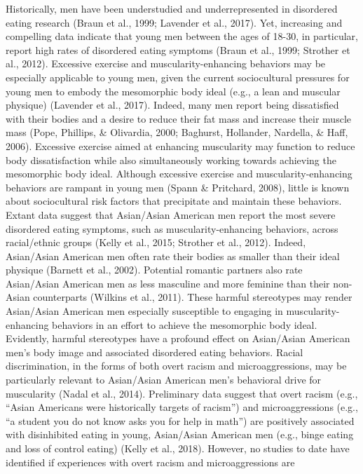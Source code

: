 \documentclass[
  12pt,
]{article}
\begin{document}
Historically, men have been understudied and underrepresented in
disordered eating research (Braun et al., 1999; Lavender et al., 2017).
Yet, increasing and compelling data indicate that young men between the
ages of 18-30, in particular, report high rates of disordered eating
symptoms (Braun et al., 1999; Strother et al., 2012). Excessive exercise
and muscularity-enhancing behaviors may be especially applicable to
young men, given the current sociocultural pressures for young men to
embody the mesomorphic body ideal (e.g., a lean and muscular physique)
(Lavender et al., 2017). Indeed, many men report being dissatisfied with
their bodies and a desire to reduce their fat mass and increase their
muscle mass (Pope, Phillips, \& Olivardia, 2000; Baghurst, Hollander,
Nardella, \& Haff, 2006). Excessive exercise aimed at enhancing
muscularity may function to reduce body dissatisfaction while also
simultaneously working towards achieving the mesomorphic body ideal.
Although excessive exercise and muscularity-enhancing behaviors are
rampant in young men (Spann \& Pritchard, 2008), little is known about
sociocultural risk factors that precipitate and maintain these
behaviors. Extant data suggest that Asian/Asian American men report the
most severe disordered eating symptoms, such as muscularity-enhancing
behaviors, across racial/ethnic groups (Kelly et al., 2015; Strother et
al., 2012). Indeed, Asian/Asian American men often rate their bodies as
smaller than their ideal physique (Barnett et al., 2002). Potential
romantic partners also rate Asian/Asian American men as less masculine
and more feminine than their non-Asian counterparts (Wilkins et al.,
2011). These harmful stereotypes may render Asian/Asian American men
especially susceptible to engaging in muscularity-enhancing behaviors in
an effort to achieve the mesomorphic body ideal. Evidently, harmful
stereotypes have a profound effect on Asian/Asian American men's body
image and associated disordered eating behaviors. Racial discrimination,
in the forms of both overt racism and microaggressions, may be
particularly relevant to Asian/Asian American men's behavioral drive for
muscularity (Nadal et al., 2014). Preliminary data suggest that overt
racism (e.g., ``Asian Americans were historically targets of racism'')
and microaggressions (e.g., ``a student you do not know asks you for
help in math'') are positively associated with disinhibited eating in
young, Asian/Asian American men (e.g., binge eating and loss of control
eating) (Kelly et al., 2018). However, no studies to date have
identified if experiences with overt racism and microaggressions are
\end{document}
